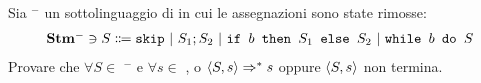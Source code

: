 \newcommand{\stmm}{\stm$^{-}$}

{Sia \stmm{} un sottolinguaggio di \stm{} in cui le assegnazioni sono state
rimosse:
\begin{align*}
\mbox{\stmm} \ni{} S \Coloneqq{}  \skipForFriends\ | \ 
                                  S_1; S_2\ | \ 
                                  \ifABC{b}{S_1}{S_2}\ | \ 
                                  \wbS{b}{S}
\end{align*}
Provare che $\forall{S} \in$ \stmm{} e $\forall{s} \in$ \states, o
$\langle{}S, s\rangle{} \Rightarrow^{*} s$ oppure $\langle{}S, s\rangle{}$ non termina.
}
{}


\undef{\stmm}

